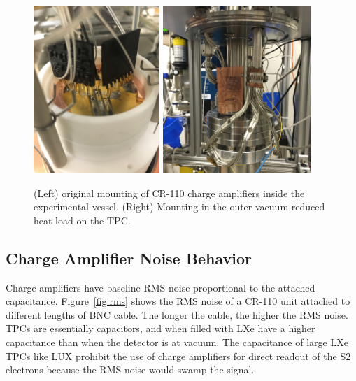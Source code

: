  \begin{figure}[htbp]
\begin{center}
\includegraphics[height=2.5in, keepaspectratio]{figures/testbed/chargeamp_mount1.jpg}
\includegraphics[height=2.5in, keepaspectratio]{figures/testbed/chargeamp_mount2.jpg}
\caption{(Left) original mounting of CR-110 charge amplifiers inside the experimental vessel. (Right) Mounting in the outer vacuum reduced heat load on the TPC.}
\label{fig:chargeamp_mount}
\end{center}
\end{figure}

\subsection{Charge Amplifier Noise Behavior}
Charge amplifiers have baseline RMS noise proportional to the attached capacitance. Figure~\ref{fig:rms} shows the RMS noise of a CR-110 unit attached to different lengths of BNC cable. The longer the cable, the higher the RMS noise. \ac{TPC}s are essentially capacitors, and when filled with \ac{LXe} have a higher capacitance than when the detector is at vacuum. The capacitance of large \ac{LXe} \ac{TPC}s like \ac{LUX} prohibit the use of charge amplifiers for direct readout of the S2 electrons because the RMS noise would swamp the signal. 


